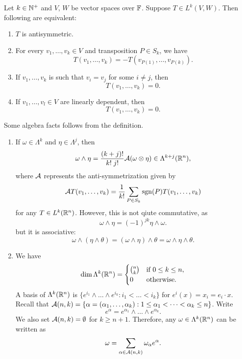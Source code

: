 \documentclass[a4paper]{article}
\begin{document}
\begin{thm}
  Let $k \in \mathbb{N}^+$ and $V$, $W$ be vector spaces over $\mathbb{F}$. Suppose $T \in
    L^k(V, W)$. Then following are equivalent:
  \begin{enumerate}
    \item $T$ is antisymmetric.
    \item For every $v_1, \dots, v_k \in V$ and transposition $P \in S_k$,
          we have
          \[
            T(v_1, \dots, v_k) = -T (v_{P(1)}, \dots, v_{P(k)}).
          \]
    \item If $v_1, \dots, v_k$ is such that $v_i = v_j$ for some $i \neq
          j$, then
          \[
            T(v_1, \dots, v_k) = 0.
          \]
    \item If $v_1, \dots, v_l \in V$ are linearly dependent, then
          \[
            T(v_1, \dots, v_k) = 0.
          \]
  \end{enumerate}
\end{thm}

Some algebra facts follows from the definition.
\begin{enumerate}
  \item If $\omega \in \Lambda^k$ and $\eta \in \Lambda^j$, then
        \[
          \omega \wedge \eta = \frac{(k+j)!}{k! \; j!} \mathcal{A} (\omega
          \otimes \eta) \in \Lambda^{k+j}(\mathbb{R}^n),
        \]
        where $\mathcal{A}$ represents the anti-symmetrization given by
        \[
          \mathcal{A} T(v_1, \dots, v_k) = \frac{1}{k!}
          \sum_{P \in S_k} \operatorname{sgn}(P) T(v_1, \dots, v_k)
        \]
        for any $T \in L^k(\mathbb{R}^n)$. However, this is not qiute commutative,
        as
        \[
          \omega \wedge \eta = (-1)^{jk} \eta \wedge \omega.
        \]
        but it is associative:
        \[
          \omega \wedge (\eta \wedge \theta)
          = (\omega \wedge \eta) \wedge \theta
          = \omega \wedge \eta \wedge \theta.
        \]

  \item We have
        \[
          \dim \Lambda^k(\mathbb{R}^n) = \begin{cases}
          \binom{n}{k} & \text{if $0 \leq k \leq n$},\\
          0 & \text{otherwise}.
          \end{cases}
        \]
        A basis of $\Lambda^k (\mathbb{R}^n)$ is $\{e^{i_1} \wedge \dots \wedge
        e^{i_k} : i_1 < \dots < i_k\}$ for $e^i (x) = x_i = e_i \cdot x$.
        Recall that $\mathcal{A}(n, k) = \{\alpha = (\alpha_1, \dots, \alpha_k)
        : 1 \leq \alpha_1 < \dots < \alpha_k \leq n\}$. Write
        \[
          e^{\alpha} = e^{\alpha_1} \wedge \dots \wedge
          e^{\alpha_k}.
        \]
        We also set $\mathcal{A}(n, k) = \emptyset$ for $k \geq n + 1$.
        Therefore, any $\omega \in \Lambda^k(\mathbb{R}^n)$ can be written as
        \[
          \omega = \sum_{\alpha \in \mathcal{A}(n, k)}
          \omega_\alpha e^{\alpha}.
        \]
\end{enumerate}
\end{document}
